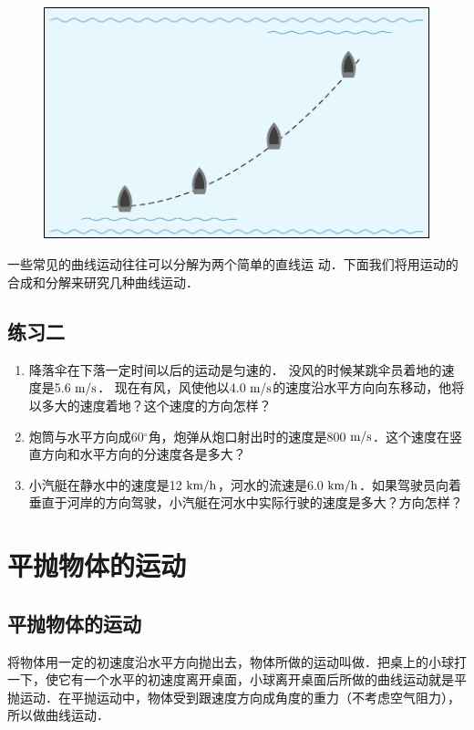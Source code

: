 \begin{figure}[htbp]
    \centering
    \includegraphics{fig/A/4-8.pdf}
    \caption{}\label{fig_A_4-8}
\end{figure}

一些常见的曲线运动往往可以分解为两个简单的直线运
动．下面我们将用运动的合成和分解来研究几种曲线运动．

\subsection*{练习二}
\begin{enumerate}
    \item 降落伞在下落一定时间以后的运动是匀速的．
    没风的时候某跳伞员着地的速度是5.6$\;\text{m}/\text{s}$．
    现在有风，风使他以4.0$\;\text{m}/\text{s}$的速度沿水平方向向东移动，他将以多大的速度着地？这个速度的方向怎样？
\item 炮筒与水平方向成60$^\circ$角，炮弹从炮口射出时的速度是800$\;\text{m}/\text{s}$．这个速度在竖直方向和水平方向的分速度各是多大？
\item 小汽艇在静水中的速度是12$\;\text{km}/\text{h}$，河水的流速是6.0$\;\text{km}/\text{h}$．如果驾驶员向着垂直于河岸的方向驾驶，小汽艇在河水中实际行驶的速度是多大？方向怎样？
\end{enumerate}


\section{平抛物体的运动}
\subsection{平抛物体的运动} 

将物体用一定的初速度沿水平方向抛出去，物体所做的运动叫做．把桌上的小球打一下，使它有一个水平的初速度离开桌面，小球离开桌面后所做的曲线运动就是平抛运动．在平抛运动中，物体受到跟速度方向成角度的重力（不考虑空气阻力），所以做曲线运动．

